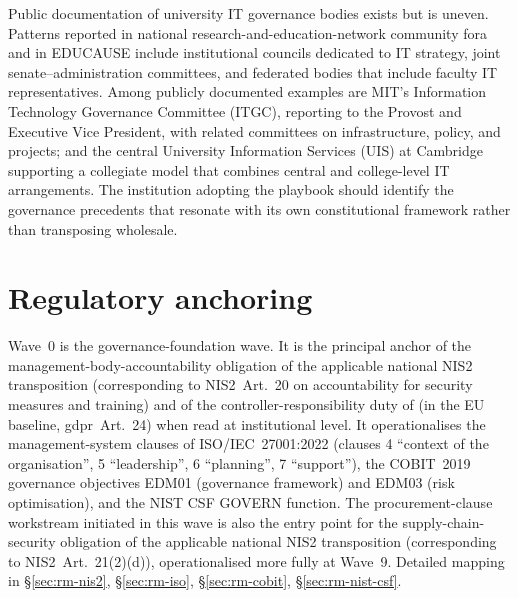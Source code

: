 \begin{realworldbox}
\noindent Public documentation of university IT governance bodies
exists but is uneven. Patterns reported in national
research-and-education-network community fora and in
EDUCAUSE include institutional
councils dedicated to IT strategy, joint senate--administration
committees, and federated bodies that include faculty IT
representatives. Among publicly documented examples are MIT's
Information Technology Governance Committee (ITGC), reporting to
the Provost and Executive Vice President, with related committees on
infrastructure, policy, and projects; and the central University
Information Services (UIS) at Cambridge supporting a collegiate
model that combines central and college-level IT arrangements. The
institution adopting the playbook should
identify the governance precedents that resonate with its own
constitutional framework rather than transposing wholesale.
\end{realworldbox}

\section{Regulatory anchoring}
\label{sec:w0-regulatory}

\noindent Wave~0 is the governance-foundation wave. It is the
principal anchor of the management-body-accountability obligation
of the applicable national NIS2 transposition (corresponding to
NIS2~Art.~20 on accountability for security measures and training)
and of the controller-responsibility duty of 
(in the EU baseline, \gls{gdpr}~Art.~24) when read at institutional level. It
operationalises the management-system clauses of
ISO/IEC~27001:2022 (clauses 4 ``context of the organisation'', 5
``leadership'', 6 ``planning'', 7 ``support''), the COBIT~2019
governance objectives EDM01 (governance framework) and EDM03
(risk optimisation), and the NIST CSF \textsf{GOVERN} function.
The procurement-clause workstream initiated in this wave is also
the entry point for the supply-chain-security obligation of the
applicable national NIS2 transposition (corresponding to
NIS2~Art.~21(2)(d)), operationalised more fully at Wave~9. Detailed mapping in
 \S\ref{sec:rm-nis2},
\S\ref{sec:rm-iso}, \S\ref{sec:rm-cobit},
\S\ref{sec:rm-nist-csf}.
